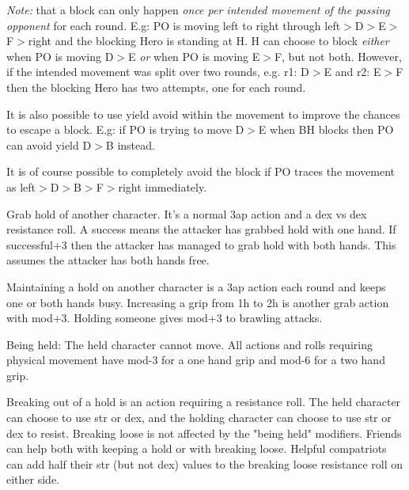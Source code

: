 \emph{Note:} that a block can only happen \emph{once per intended movement of the passing opponent} for each round. E.g: PO is moving left to right through left$>$D$>$E$>$F$>$right and the blocking Hero is standing at H. H can choose to block \emph{either} when PO is moving D$>$E \emph{or} when PO is moving E$>$F, but not both. However, if the intended movement was split over two rounds, e.g. r1: D$>$E and r2: E$>$F then the blocking Hero has two attempts, one for each round.

It is also possible to use yield avoid within the movement to improve the chances to escape a block. E.g: if PO is trying to move D$>$E when BH blocks then PO can avoid yield D$>$B instead.

It is of course possible to completely avoid the block if PO traces the movement as left$>$D$>$B$>$F$>$right immediately.


 Grab hold of another character. It's a normal 3ap action and a dex vs dex resistance roll. A success means the attacker has grabbed hold with one hand. If successful+3 then the attacker has managed to grab hold with both hands. This assumes the attacker has both hands free.


 Maintaining a hold on another character is a 3ap action each round and keeps one or both hands busy. Increasing a grip from 1h to 2h is another grab action with mod+3.
Holding someone gives mod+3 to brawling attacks.

Being held: The held character cannot move. All actions and rolls requiring physical movement have mod-3 for a one hand grip and mod-6 for a two hand grip.


 Breaking out of a hold is an action requiring a resistance roll. The held character can choose to use str or dex, and the holding character can choose to use str or dex to resist. Breaking loose is not affected by the "being held" modifiers. Friends can help both with keeping a hold or with breaking loose. Helpful compatriots can add half their str (but not dex) values to the breaking loose resistance roll on either side.

\closeactionslist

















